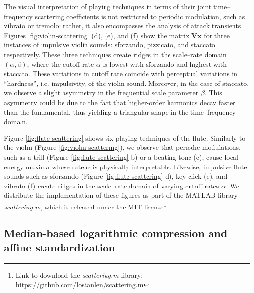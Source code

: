 \documentclass{bmcart}
\makeatletter
\newcommand*{\eg}{e.g.,\@\xspace}
\makeatother
\begin{document}
The visual interpretation of playing techniques in terms of their joint time--frequency scattering coefficients is not restricted to periodic modulation, such as vibrato or tremolo: rather, it also encompasses the analysis of attack transients.
Figures \ref{fig:violin-scattering} (d), (e), and (f) show the matrix $\mathbf{V}\boldsymbol{x}$ for three instances of impulsive violin sounds: sforzando, pizzicato, and staccato respectively.
These three techniques create ridges in the scale--rate domain $(\alpha, \beta)$, where the cutoff rate $\alpha$ is lowest with sforzando and highest with staccato.
These variations in cutoff rate coincide with perceptual variations in ``hardness'', i.e. impulsivity, of the violin sound.
Moreover, in the case of staccato, we observe a slight asymmetry in the frequential scale parameter $\beta$.
This asymmetry could be due to the fact that higher-order harmonics decay faster than the fundamental, thus yielding a triangular shape in the time--frequency domain.

Figure \ref{fig:flute-scattering} shows six playing techniques of the flute.
Similarly to the violin (Figure \ref{fig:violin-scattering}), we observe that periodic modulations, such as a trill (Figure \ref{fig:flute-scattering} b) or a beating tone (c), cause local energy maxima whose rate $\alpha$ is physically interpretable.
Likewise, impulsive flute sounds such as sforzando (Figure \ref{fig:flute-scattering} d), key click (e), and vibrato (f) create ridges in the scale--rate domain of varying cutoff rates $\alpha$.
We distribute the implementation of these figures as part of the MATLAB library \emph{scattering.m}, which is released under the MIT license\footnote{Link to download the \emph{scattering.m} library: \url{https://github.com/lostanlen/scattering.m}}.


\subsection*{Median-based logarithmic compression and affine standardization}
\label{sec:gaussianization}

\end{document}
